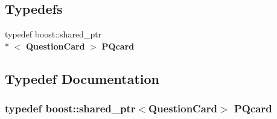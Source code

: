 \subsection*{Typedefs}
\begin{DoxyCompactItemize}
\item 
typedef boost\-::shared\-\_\-ptr\\*
$<$ {\bf Question\-Card} $>$ {\bf P\-Qcard}
\end{DoxyCompactItemize}


\subsection{Typedef Documentation}
\subsubsection[{P\-Qcard}]{\setlength{\rightskip}{0pt plus 5cm}typedef boost\-::shared\-\_\-ptr$<${\bf Question\-Card}$>$ {\bf P\-Qcard}}\label{deck_8h_a54008efd53547f8511ef43fe2fcc1b70}
